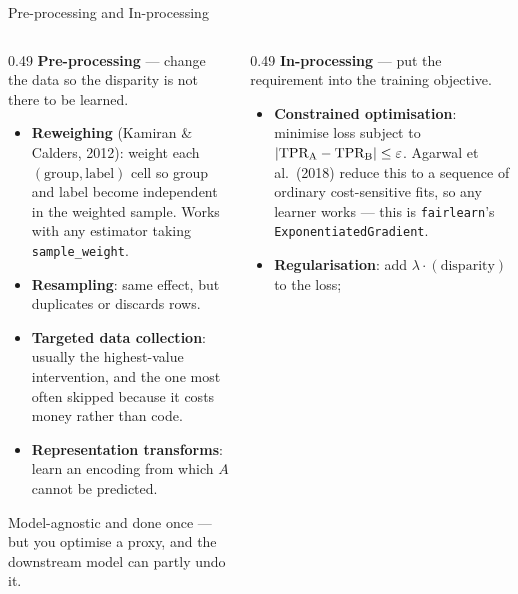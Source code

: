 
\begin{frame}{Pre-processing and In-processing}

    \begin{columns}[T]
        \begin{column}{0.49\textwidth}
            \textbf{Pre-processing} --- change the data so the disparity is not there to be learned.
            \vspace{0.4em}
            \begin{itemize}\scriptsize
                \setlength\itemsep{0.32em}
                \item \textbf{Reweighing} (Kamiran \& Calders, 2012): weight each
                      $(\text{group},\text{label})$ cell so group and label become independent in
                      the weighted sample. Works with any estimator taking
                      \texttt{sample\_weight}.
                \item \textbf{Resampling}: same effect, but duplicates or discards rows.
                \item \textbf{Targeted data collection}: usually the highest-value intervention,
                      and the one most often skipped because it costs money rather than code.
                \item \textbf{Representation transforms}: learn an encoding from which $A$ cannot
                      be predicted.
            \end{itemize}
            \vspace{0.4em}
            {\scriptsize Model-agnostic and done once --- but you optimise a proxy, and the
            downstream model can partly undo it.}
        \end{column}
        \begin{column}{0.49\textwidth}
            \textbf{In-processing} --- put the requirement into the training objective.
            \vspace{0.4em}
            \begin{itemize}\scriptsize
                \setlength\itemsep{0.32em}
                \item \textbf{Constrained optimisation}: minimise loss subject to
                      $|\text{TPR}_{\text{A}} - \text{TPR}_{\text{B}}| \leq \varepsilon$. Agarwal et al.\ (2018)
                      reduce this to a sequence of ordinary cost-sensitive fits, so any learner
                      works --- this is \texttt{fairlearn}'s \texttt{ExponentiatedGradient}.
                \item \textbf{Regularisation}: add $\lambda \cdot (\text{disparity})$ to the loss;

\end{itemize}
\end{column}
\end{columns}
\end{frame}
